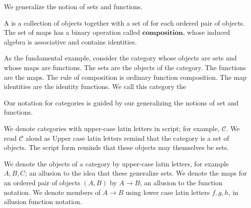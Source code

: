 
\sbasic



\sstart



We generalize the notion of sets and functions.


A  is a collection of objects together with a set of  for each ordered pair of objects.
The set of maps has a binary operation called $\textbf{composition}$, whose induced algebra is associative and contains identities.

As the fundamental example, consider the category whose objects are sets and whose maps are functions.
The sets are the objects of the category.
The functions are the maps.
The rule of composition is ordinary function composition.
The map identities are the identity functions.
We call this category the 


Our notation for categories is guided by our generalizing the notions of set and functions.

We denote categories with upper-case latin letters in script; for example, $\mathcal{C}$.
We read $\mathcal{C}$ aloud as 
Upper case latin letters remind that the category is a set of objects.
The script form reminds that these objects may themselves be sets.

We denote the objects of a category by upper-case latin letters, for example $A, B, C$; an allusion to the idea that these generalize sets.
We denote the maps for an ordered pair of objects $(A, B)$ by $A \to B$; an allusion to the function notation.
We denote members of $A \to B$  using lower case latin letters $f, g, h$, in allusion function notation.

\strats
